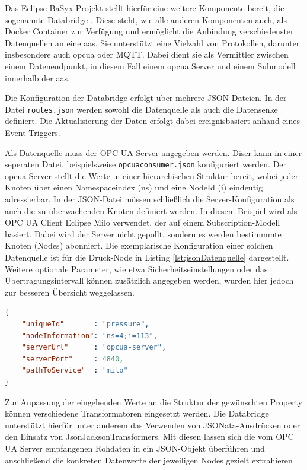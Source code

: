 Das Eclipse BaSyx Projekt stellt hierfür eine weitere Komponente bereit, die sogenannte Databridge \cite{BaSyxDatabridge}.
Diese steht, wie alle anderen Komponenten auch, als Docker Container zur Verfügung und ermöglicht die Anbindung verschiedenster Datenquellen an eine \acs{aas}.
Sie unterstützt eine Vielzahl von Protokollen, darunter insbesondere auch \acs{opcua} oder MQTT.
Dabei dient sie als Vermittler zwischen einem Datenendpunkt, in diesem Fall einem \acs{opcua} Server und einem Submodell innerhalb der \acs{aas}.

Die Konfiguration der Databridge erfolgt über mehrere JSON-Dateien.
In der Datei \texttt{routes.json} werden sowohl die Datenquelle als auch die Datensenke definiert.
Die Aktualisierung der Daten erfolgt dabei ereignisbasiert anhand eines Event-Triggers.

Als Datenquelle muss der OPC UA Server angegeben werden.
Diser kann in einer seperaten Datei, beispielsweise \texttt{opcuaconsumer.json} konfiguriert werden.
Der \acs{opcua} Server stellt die Werte in einer hierarchischen Struktur bereit, wobei jeder Knoten über einen Namespaceindex (ns) und eine NodeId (i) eindeutig adressierbar.
In der JSON-Datei müssen schließlich die Server-Konfiguration als auch die zu überwachenden Knoten definiert werden.
In diesem Beispiel wird als OPC UA Client Eclipse Milo verwendet, der auf einem Subscription-Modell basiert.
Dabei wird der Server nicht gepollt, sondern es werden bestimmmte Knoten (Nodes) abonniert.
Die exemplarische Konfiguration einer solchen Datenquelle ist für die Druck-Node in Listing \ref{lst:jsonDatenquelle} dargestellt.
Weitere optionale Parameter, wie etwa Sicherheitseinstellungen oder das Übertragungsintervall können zusätzlich angegeben werden, wurden hier jedoch zur besseren Übersicht weggelassen.

\begin{lstlisting}[language=json, caption={Beispielhafte JSON-Konfiguration einer Datenquelle}, label={lst:jsonDatenquelle}]
{
    "uniqueId"       : "pressure",
    "nodeInformation": "ns=4;i=113",
    "serverUrl"      : "opcua-server",
    "serverPort"     : 4840,
    "pathToService"  : "milo"
}
\end{lstlisting}

Zur Anpassung der eingehenden Werte an die Struktur der gewünschten Property können verschiedene Transformatoren eingesetzt werden. 
Die Databridge unterstützt hierfür unter anderem das Verwenden von JSONata-Ausdrücken oder den Einsatz von JsonJacksonTransformers. 
Mit diesen lassen sich die vom OPC UA Server empfangenen Rohdaten in ein JSON-Objekt überführen und anschließend die konkreten Datenwerte der jeweiligen Nodes gezielt extrahieren

